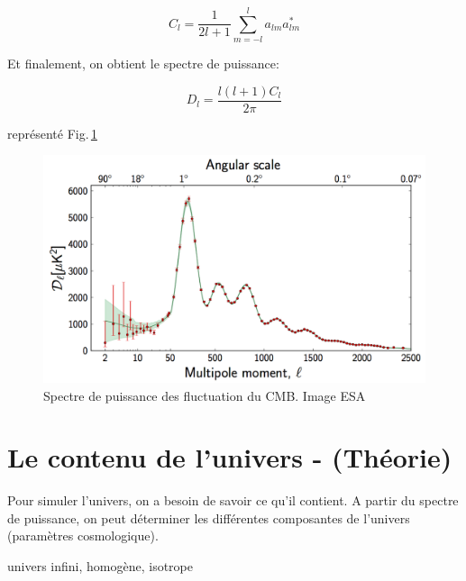 \begin{equation}
C_l = \frac{1}{2l+1} \sum_{m=-l}^l a_{lm} a_{lm}^*
\end{equation}


Et finalement, on obtient le spectre de puissance:

\begin{equation}
D_l = \frac{l (l+1) C_l }{2 \pi} 
\end{equation}

représenté Fig.\,\ref{fig:cmb_power_spectrum}

\begin{figure}[bth]
        \includegraphics[width=.95\linewidth]{img/01/CMB_power_spectrum.png} 
        \caption{Spectre de puissance des fluctuation du CMB.
        Image ESA}
 		\label{fig:cmb_power_spectrum}
\end{figure}


\section{Le contenu de l'univers - (Théorie)}

Pour simuler l'univers, on a besoin de savoir ce qu'il contient. 
A partir du spectre de puissance, on peut déterminer les différentes composantes de l'univers (paramètres cosmologique).

univers infini, homogène, isotrope




